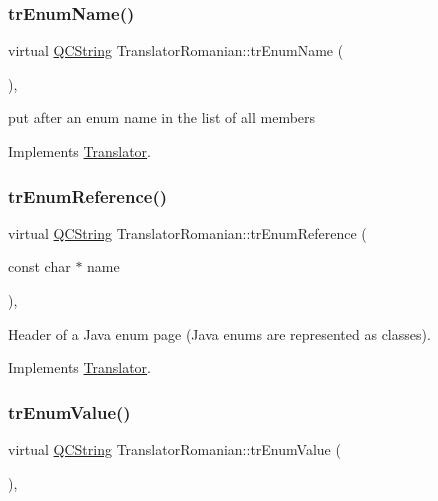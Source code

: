 \subsubsection{\texorpdfstring{trEnumName()}{trEnumName()}}
{\footnotesize\ttfamily virtual \mbox{\hyperlink{class_q_c_string}{Q\+C\+String}} Translator\+Romanian\+::tr\+Enum\+Name (\begin{DoxyParamCaption}{ }\end{DoxyParamCaption})\hspace{0.3cm}{\ttfamily [inline]}, {\ttfamily [virtual]}}

put after an enum name in the list of all members 

Implements \mbox{\hyperlink{class_translator}{Translator}}.

\mbox{\label{class_translator_romanian_abee7e60863a2f4a031f7922952d7007c}} 
\subsubsection{\texorpdfstring{trEnumReference()}{trEnumReference()}}
{\footnotesize\ttfamily virtual \mbox{\hyperlink{class_q_c_string}{Q\+C\+String}} Translator\+Romanian\+::tr\+Enum\+Reference (\begin{DoxyParamCaption}\item[{const char $\ast$}]{name }\end{DoxyParamCaption})\hspace{0.3cm}{\ttfamily [inline]}, {\ttfamily [virtual]}}

Header of a Java enum page (Java enums are represented as classes). 

Implements \mbox{\hyperlink{class_translator}{Translator}}.

\mbox{\label{class_translator_romanian_a00cf2157b9e9e9aa79bf89dbd415297f}} 
\subsubsection{\texorpdfstring{trEnumValue()}{trEnumValue()}}
{\footnotesize\ttfamily virtual \mbox{\hyperlink{class_q_c_string}{Q\+C\+String}} Translator\+Romanian\+::tr\+Enum\+Value (\begin{DoxyParamCaption}{ }\end{DoxyParamCaption})\hspace{0.3cm}{\ttfamily [inline]}, {\ttfamily [virtual]}}

